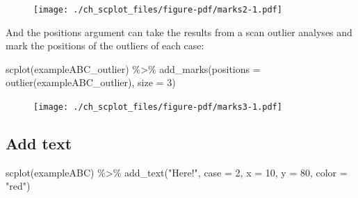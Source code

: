 \documentclass[
  letterpaper,
  DIV=11,
  numbers=noendperiod]{scrreprt}
\newenvironment{Shaded}{\begin{snugshade}}{\end{snugshade}}
\newcommand{\AttributeTok}[1]{\textcolor[rgb]{0.40,0.45,0.13}{#1}}
\newcommand{\DecValTok}[1]{\textcolor[rgb]{0.68,0.00,0.00}{#1}}
\newcommand{\FunctionTok}[1]{\textcolor[rgb]{0.28,0.35,0.67}{#1}}
\newcommand{\NormalTok}[1]{\textcolor[rgb]{0.00,0.23,0.31}{#1}}
\newcommand{\SpecialCharTok}[1]{\textcolor[rgb]{0.37,0.37,0.37}{#1}}
\newcommand{\StringTok}[1]{\textcolor[rgb]{0.13,0.47,0.30}{#1}}
\begin{document}
\begin{figure}[H]

{\centering \texttt{[image: ./ch\_scplot\_files/figure-pdf/marks2-1.pdf]}

}

\end{figure}

And the positions argument can take the results from a scan outlier
analyses and mark the positions of the outliers of each case:

\begin{Shaded}
\begin{Highlighting}[]
\FunctionTok{scplot}\NormalTok{(exampleABC\_outlier) }\SpecialCharTok{\%\textgreater{}\%} 
  \FunctionTok{add\_marks}\NormalTok{(}\AttributeTok{positions =} \FunctionTok{outlier}\NormalTok{(exampleABC\_outlier), }\AttributeTok{size =} \DecValTok{3}\NormalTok{)}
\end{Highlighting}
\end{Shaded}

\begin{figure}[H]

{\centering \texttt{[image: ./ch\_scplot\_files/figure-pdf/marks3-1.pdf]}

}

\end{figure}

\hypertarget{add-text}{%
\subsection{Add text}\label{add-text}}

\begin{Shaded}
\begin{Highlighting}[]
\FunctionTok{scplot}\NormalTok{(exampleABC) }\SpecialCharTok{\%\textgreater{}\%}
  \FunctionTok{add\_text}\NormalTok{(}\StringTok{"Here!"}\NormalTok{, }\AttributeTok{case =} \DecValTok{2}\NormalTok{, }\AttributeTok{x =} \DecValTok{10}\NormalTok{, }\AttributeTok{y =} \DecValTok{80}\NormalTok{, }\AttributeTok{color =} \StringTok{"red"}\NormalTok{)}
\end{Highlighting}
\end{Shaded}
\end{document}
